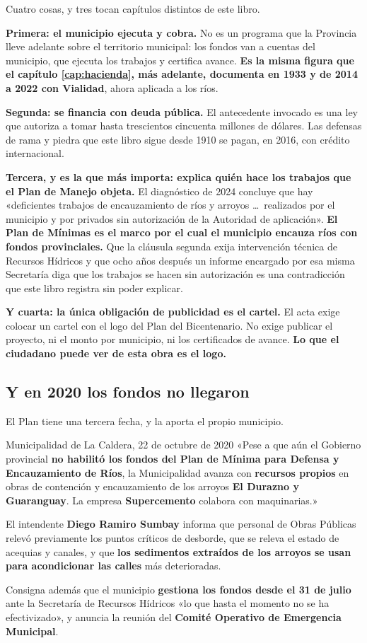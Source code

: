 Cuatro cosas, y tres tocan capítulos distintos de este libro.

\textbf{Primera: el municipio ejecuta y cobra.} No es un programa que la Provincia lleve
adelante sobre el territorio municipal: los fondos van a cuentas del municipio, que ejecuta
los trabajos y certifica avance. \textbf{Es la misma figura que el capítulo \ref{cap:hacienda}, más adelante, documenta en
1933 y de 2014 a 2022 con Vialidad}, ahora aplicada a los ríos.

\textbf{Segunda: se financia con deuda pública.} El antecedente invocado es una ley que
autoriza a tomar hasta trescientos cincuenta millones de dólares. Las defensas de rama y
piedra que este libro sigue desde 1910 se pagan, en 2016, con crédito internacional.

\textbf{Tercera, y es la que más importa: explica quién hace los trabajos que el Plan de
Manejo objeta.} El diagnóstico de 2024 concluye que hay «deficientes trabajos de
encauzamiento de ríos y arroyos \ldots\ realizados por el municipio y por privados sin
autorización de la Autoridad de aplicación». \textbf{El Plan de Mínimas es el marco por el
cual el municipio encauza ríos con fondos provinciales.} Que la cláusula segunda exija
intervención técnica de Recursos Hídricos y que ocho años después un informe encargado por esa
misma Secretaría diga que los trabajos se hacen sin autorización es una contradicción que este
libro registra sin poder explicar.

\textbf{Y cuarta: la única obligación de publicidad es el cartel.} El acta exige colocar un
cartel con el logo del Plan del Bicentenario. No exige publicar el proyecto, ni el monto por
municipio, ni los certificados de avance. \textbf{Lo que el ciudadano puede ver de esta obra
es el logo.}

\subsection*{Y en 2020 los fondos no llegaron}

El Plan tiene una tercera fecha, y la aporta el propio municipio.

\begin{ficha}{Municipalidad de La Caldera, 22 de octubre de 2020}
«Pese a que aún el Gobierno provincial \textbf{no habilitó los fondos del Plan de Mínima para
Defensa y Encauzamiento de Ríos}, la Municipalidad avanza con \textbf{recursos propios} en
obras de contención y encauzamiento de los arroyos \textbf{El Durazno y Guaranguay}. La empresa
\textbf{Supercemento} colabora con maquinarias.»

El intendente \textbf{Diego Ramiro Sumbay} informa que personal de
Obras Públicas relevó previamente los puntos críticos de desborde, que se releva el estado de
acequias y canales, y que \textbf{los sedimentos extraídos de los arroyos se usan para
acondicionar las calles} más deterioradas.

Consigna además que el municipio \textbf{gestiona los fondos desde el 31 de julio} ante la
Secretaría de Recursos Hídricos «lo que hasta el momento no se ha efectivizado», y anuncia la
reunión del \textbf{Comité Operativo de Emergencia Municipal}.
\end{ficha}

